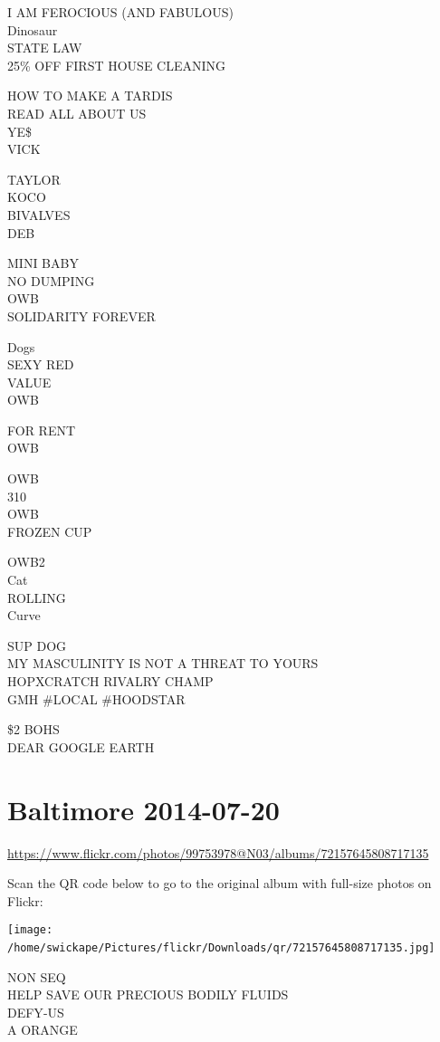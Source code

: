 \documentclass[10pt,letterpaper]{article}
\begin{document}
I AM FEROCIOUS (AND FABULOUS)\\
Dinosaur\\
STATE LAW\\
25\% OFF FIRST HOUSE CLEANING

HOW TO MAKE A TARDIS\\
READ ALL ABOUT US\\
YE\$\\
VICK

TAYLOR\\
KOCO\\
BIVALVES\\
DEB

MINI BABY\\
NO DUMPING\\
OWB\\
SOLIDARITY FOREVER

Dogs\\
SEXY RED\\
VALUE\\
OWB

FOR RENT\\
OWB

OWB\\
310\\
OWB\\
FROZEN CUP

OWB2\\
Cat\\
ROLLING\\
Curve

SUP DOG\\
MY MASCULINITY IS NOT A THREAT TO YOURS\\
HOPXCRATCH RIVALRY CHAMP\\
GMH \#LOCAL \#HOODSTAR

\$2 BOHS\\
DEAR GOOGLE EARTH
\

\section*{Baltimore 2014-07-20}

\url{https://www.flickr.com/photos/99753978@N03/albums/72157645808717135}

Scan the QR code below to go to the original album with full-size photos on Flickr:

\texttt{[image: /home/swickape/Pictures/flickr/Downloads/qr/72157645808717135.jpg]}
\

NON SEQ\\
HELP SAVE OUR PRECIOUS BODILY FLUIDS\\
DEFY{-}US\\
A ORANGE
\end{document}
